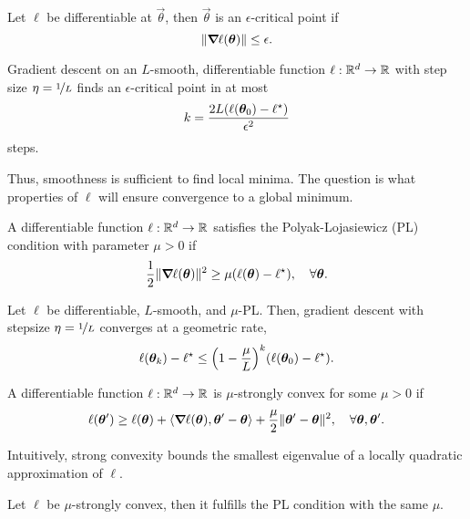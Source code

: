 \begin{definition}
    Let $\ell$ be differentiable at $\vec{\theta}$, then $\vec{\theta}$ is an $\epsilon$-critical point if \[
        \| \bm{\nabla}_{\! } \ell(\bm{\theta}) \| \leq \epsilon.
    \]
\end{definition}

\begin{lemma}
    Gradient descent on an $L$-smooth, differentiable function $\ell: \mathbb{R}^d \to \mathbb{R}$ with step size $\eta = \nicefrac{1}{L}$ finds an $\epsilon$-critical point in at most \[
        k = \frac{2L\lft(\ell\lft(\vec{\theta}_0\rgt) - \ell^\star\rgt)}{\epsilon^2}
    \]
    steps.
\end{lemma}

Thus, smoothness is sufficient to find local minima. The question is what properties of $\ell$ will
ensure convergence to a global minimum.

\begin{definition}
    A differentiable function $\ell: \mathbb{R}^d \to \mathbb{R}$ satisfies the Polyak-Lojasiewicz (PL) condition with parameter $\mu > 0$ if \[
        \frac{1}{2} \| \bm{\nabla}_{\! } \ell(\bm{\theta}) \|^2 \geq \mu (\ell(\bm{\theta}) - \ell^\star), \quad \forall \bm{\theta}.
    \]
\end{definition}

\begin{lemma}
    Let $\ell$ be differentiable, $L$-smooth, and $\mu$-PL. Then, gradient descent with stepsize $\eta = \nicefrac{1}{L}$ converges at a geometric rate, \[
        \ell\lft( \vec{\theta}_k \rgt) - \ell^\star \leq \lft( 1 - \frac{\mu}{L} \rgt)^k \lft( \ell(\vec{\theta}_0) - \ell^\star \rgt).
    \]
\end{lemma}

\begin{definition}
    A differentiable function $\ell: \mathbb{R}^d \to \mathbb{R}$ is $\mu$-strongly convex for some $\mu > 0$ if \[
        \ell(\bm{\theta}') \geq \ell(\bm{\theta}) + \langle \bm{\nabla}_{\! } \ell(\bm{\theta}), \bm{\theta}' - \bm{\theta} \rangle + \frac{\mu}{2} \| \bm{\theta}' - \bm{\theta} \|^2, \quad \forall \bm{\theta}, \bm{\theta}'.
    \]
\end{definition}

Intuitively, strong convexity bounds the smallest eigenvalue of a locally quadratic approximation
of $\ell$.

\begin{lemma}
    Let $\ell$ be $\mu$-strongly convex, then it fulfills the PL condition with the same $\mu$.
\end{lemma}

